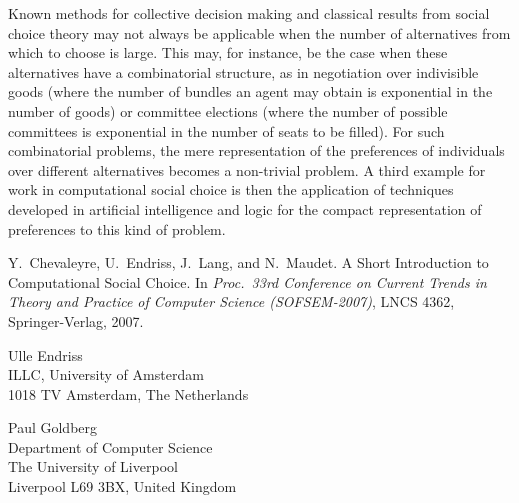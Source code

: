 \documentclass{comsoc2008}
\begin{document}
Known methods for collective decision making and classical results from 
social choice theory may not always be applicable when the number of 
alternatives from which to choose is large. This may, for instance, be 
the case when these alternatives have a combinatorial structure, as in 
negotiation over indivisible goods (where the number of bundles an agent 
may obtain is exponential in the number of goods) or committee elections 
(where the number of possible committees is exponential in the number 
of seats to be filled). For such combinatorial problems, the mere 
representation of the preferences of individuals over different 
alternatives becomes a non-trivial problem. A third example for work 
in computational social choice is then the application of techniques 
developed in artificial intelligence and logic for the compact 
representation of preferences to this kind of problem. 



\begin{thebibliography}{1}

Y.~Chevaleyre, U.~Endriss, J.~Lang, and N.~Maudet. 
A Short Introduction to Computational Social Choice. 
In \emph{Proc.\ 33rd Conference on Current Trends in 
Theory and Practice of Computer Science (SOFSEM-2007)}, 
LNCS 4362, Springer-Verlag, 2007.

\end{thebibliography}



\begin{contact}
Ulle Endriss \\
ILLC, University of Amsterdam \\
1018 TV Amsterdam, The Netherlands \\
\end{contact}

\begin{contact}
Paul Goldberg \\
Department of Computer Science \\
The University of Liverpool \\
Liverpool L69 3BX, United Kingdom \\
\end{contact}

\end{document}
